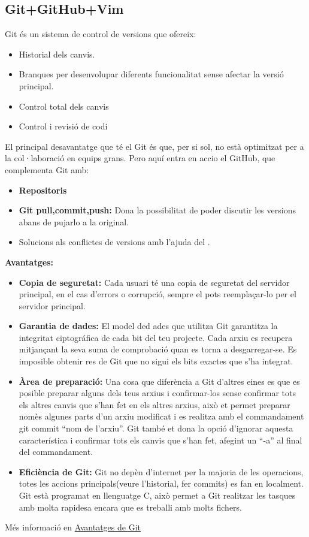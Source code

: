 \subsection{Git+GitHub+Vim}\label{subsec:Git+GitHub+Vim}
Git és un sistema de control de versions que ofereix:
\begin{itemize}
 \item Historial dels canvis.
 \item Branques per desenvolupar diferents funcionalitat sense afectar la versió principal.
 \item Control total dels canvis
 \item Control i revisió de codi
\end{itemize}
El principal desavantatge que té el Git és que, per si sol, no està optimitzat per a la col·laboració en equips grans. Pero aquí entra en accio el GitHub, que complementa Git amb:
\begin{itemize}
\item \textbf{Repositoris}
 \item \textbf{Git pull,commit,push:} Dona la possibilitat de poder discutir les versions abans de pujarlo a la original.
 \item Solucions als conflictes de versions amb l'ajuda del .
 \end{itemize}


\textbf{Avantatges:}
\begin{itemize}
 \item \textbf{Copia de seguretat:} Cada usuari té una copia de seguretat del servidor principal, en el cas d'errors o corrupció, sempre el pots reemplaçar-lo per el servidor principal.
 \item \textbf{Garantia de dades:} El model ded ades que utilitza Git garantitza la integritat ciptográfica de cada bit del teu projecte. Cada arxiu es recupera mitjançant la seva suma de comprobació quan es torna a desgarregar-se. Es imposible obtenir res de Git que no sigui els bits exactes que s'ha integrat.
 \item \textbf{Àrea de preparació:} Una cosa que diferència a Git d'altres eines es que es posible preparar alguns dels teus arxius i confirmar-los sense confirmar tots els altres canvis que s'han fet en els altres arxius, això et permet preparar nomès algunes parts d'un arxiu modificat i es realitza amb el commandament git commit ``nom de l'arxiu''. Git també et dona la opció d'ignorar aquesta característica i confirmar tots els canvis que s'han fet, afegint un ``-a'' al final del commandament.
 \item \textbf{Eficiència de Git:} Git no depèn d'internet per la majoria de les operacions, totes les accions principals(veure l'historial, fer commits) es fan en localment. Git està programat en llenguatge C, això permet a Git realitzar les tasques amb molta rapidesa encara que es treballi amb molts fichers.
\end{itemize}
Més informació en \href{https://git-scm.com/about/branching-and-merging}{Avantatges de Git}

